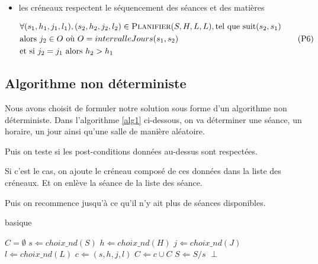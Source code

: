 \begin{itemize}
    \item les créneaux respectent le séquencement des séances et des matières

        \begin{equation}\label{eqn:p6}
            \begin{split}
                & \forall(s_1, h_1, j_1, l_1), (s_2, h_2, j_2, l_2)
                \in \textsc{Planifier}(S, H, L, L),
                \text{tel que} \  \text{suit}(s_2, s_1)\\
                & \text{alors} \  j_2 \in O
                \  \text{où} \  O = intervalleJours(s_1, s_2)\\
                & \text{et si} \  j_2 = j_1 \  \text{alors} \  h_2 > h_1
            \end{split}
            \tag{P6}
        \end{equation}

\end{itemize}

\subsection{Algorithme non déterministe}

Nous avons choisit de formuler notre solution sous forme d'un algorithme non déterministe.
Dans l'algorithme \ref{alg1} ci-dessous, on va déterminer une séance, un horaire, un jour ainsi qu'une salle de manière aléatoire.

Puis on teste si les post-conditions données au-dessus sont respectées. 

Si c'est le cas, on ajoute le créneau composé de ces données dans la liste des créneaux.
Et on enlève la séance de la liste des séance.

Puis on recommence jusqu'à ce qu'il n'y ait plus de séances disponibles.

\begin{algorithm}                    
\caption{basique}      
\label{alg1}                           
\begin{algorithmic}                
    \REQUIRE $C = \emptyset$
        \STATE $s \Leftarrow choix\_nd(S)$
        \STATE $h \Leftarrow choix\_nd(H)$
        \STATE $j \Leftarrow choix\_nd(J)$
        \STATE $l \Leftarrow choix\_nd(L)$
        \STATE $c \Leftarrow (s, h, j, l)$
            \STATE $C \Leftarrow c \cup C$
            \STATE $S \Leftarrow S / s$
        \ELSE
            \RETURN $\perp$
        \ENDIF
    \ENDWHILE
\end{algorithmic}
\end{algorithm}
